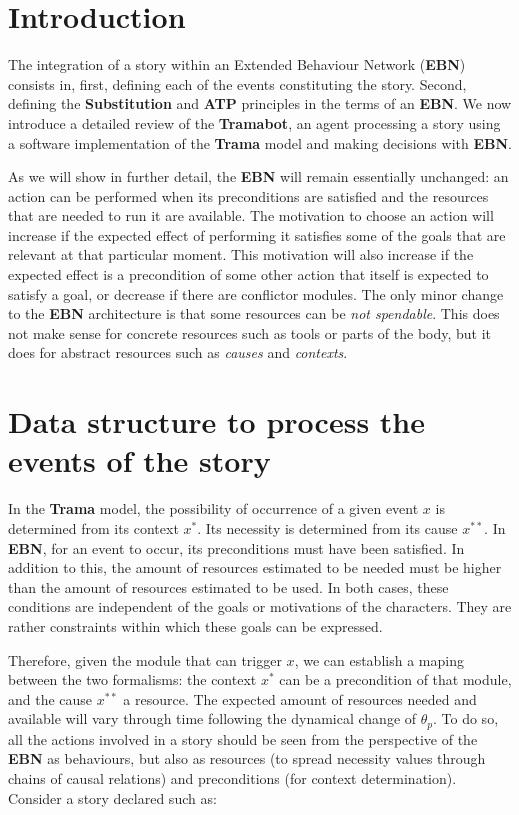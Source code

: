 \documentclass[
		twoside,openright,titlepage,numbers=noenddot,manychapters,
		headinclude,%
                footinclude=false,cleardoublepage=empty,
                BCOR=5mm,
		fontsize=11pt, %
                 enabledeprecatedfontcommands]{scrreprt}
\begin{document}
\section{Introduction}

The integration of a story within an  Extended Behaviour Network (\textbf{EBN}) consists in, first, defining each of the events constituting the story. Second, defining the \textbf{Substitution} and \textbf{ATP} principles in the terms of an \textbf{EBN}. We now introduce a detailed review of the \textbf{Tramabot}, an agent processing a story using a software implementation of the \textbf{Trama} model and making decisions with \textbf{EBN}.

As we will show in further detail, the \textbf{EBN} will remain essentially unchanged: an action can be performed when its preconditions are satisfied and the resources that are needed to run it are available. The motivation to choose an action will increase if the expected effect of performing it  satisfies some of the goals that are relevant at that particular moment. This motivation will also increase if the expected effect is a precondition of some other action that itself is expected to satisfy a goal, or decrease if there are conflictor modules. The only minor change to the \textbf{EBN} architecture is that some resources can be \emph{not spendable}. This does not make sense for concrete resources such as tools or parts of the body, but it does for abstract resources such as \emph{causes} and \emph{contexts}. 

\section{Data structure to process the events of the story}



In the \textbf{Trama} model, the possibility of occurrence of a given event $x$ is determined from its context $x^*$. Its  necessity is determined from its cause $x^{**}$. In \textbf{EBN}, for an event to occur, its preconditions must have been satisfied. In addition to this, the amount of resources estimated to be needed must be higher than the amount of resources estimated to be used. In both cases, these conditions are independent of the goals or motivations of the characters. They are rather constraints within which these goals can be expressed.

Therefore, given the module that can trigger $x$, we can establish a maping between the two formalisms: the context $x^*$ can be a precondition of that module, and the cause $x^{**}$ a resource. The expected amount of resources needed and available will vary through time following the dynamical change of $\theta_p$. To do so, all the actions involved in a story should be seen from the perspective of  the \textbf{EBN} as behaviours, but also as resources (to spread necessity values through chains of causal relations) and preconditions (for context determination).  
Consider a story declared such as:
\end{document}
